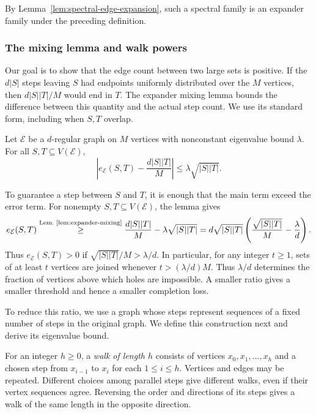 By Lemma~\ref{lem:spectral-edge-expansion}, such a spectral family
is an expander family under the preceding definition.

\subsubsection{The mixing lemma and walk powers}

Our goal is to show that the edge count between two large sets is
positive. If the $d|S|$ steps leaving $S$ had endpoints uniformly
distributed over the $M$ vertices, then $d|S||T|/M$ would end in $T$.
The expander mixing lemma bounds the difference between this
quantity and the actual step count. We use its standard form,
including when $S,T$ overlap.

\begin{lemma}
\label{lem:expander-mixing}
Let $\mathcal E$ be a $d$-regular graph on $M$ vertices with
nonconstant eigenvalue bound $\lambda$. For all
$S,T\subseteq V(\mathcal E)$,
\[
 \left|e_{\mathcal E}(S,T)-\frac{d|S||T|}{M}\right|
 \le\lambda\sqrt{|S||T|}.
\]
\end{lemma}

To guarantee a step between $S$ and $T$, it is enough that the
main term exceed the error term. For nonempty $S,T\subseteq V(\mathcal E)$,
the lemma gives
\[
 e_{\mathcal E}(S,T)
 \overset{\text{Lem.~\ref{lem:expander-mixing}}}{\geq}
 \frac{d|S||T|}{M}-\lambda\sqrt{|S||T|}
 =d\sqrt{|S||T|}\left(\frac{\sqrt{|S||T|}}{M}-\frac\lambda d\right).
\]
Thus $e_{\mathcal E}(S,T)>0$ if
$\sqrt{|S||T|}/M>\lambda/d$. In particular, for any integer $t\ge1$,
sets of at least $t$ vertices are joined whenever $t>(\lambda/d)M$. Thus $\lambda/d$
determines the fraction of vertices above which holes are
impossible. A smaller ratio gives a smaller threshold and hence a
smaller completion loss.

To reduce this ratio, we use a graph whose steps represent sequences
of a fixed number of steps in the original graph. We define this
construction next and derive its eigenvalue bound.

For an integer $h\ge0$, a \emph{walk of length $h$} consists of vertices
$x_0,x_1,\ldots,x_h$ and a chosen step from $x_{i-1}$ to $x_i$
for each $1\le i\le h$. Vertices and edges may be repeated.
Different choices among parallel steps give different walks,
even if their vertex sequences agree.
Reversing the order and directions of its steps gives
a walk of the same length in the opposite direction.

